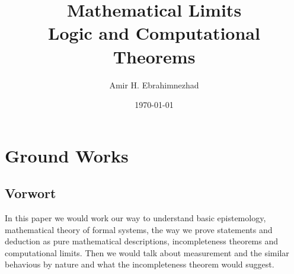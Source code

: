 \documentclass[10pt,a4paper]{article}
\title{Mathematical Limits \\ \large Logic and Computational Theorems}
\author{Amir H. Ebrahimnezhad}
\date{\today}
\newcounter{theo}
\begin{document}
        \maketitle
        \tableofcontents
        \newpage
        
        \section{Ground Works}
            \subsection{Vorwort}
              In this paper we would work our way to understand basic epistemology, mathematical theory of formal systems, the way we prove statements and deduction as pure mathematical descriptions, incompleteness theorems and computational limits. Then we would talk about measurement and the similar behavious by nature and what the incompleteness theorem would suggest. 
\end{document}
